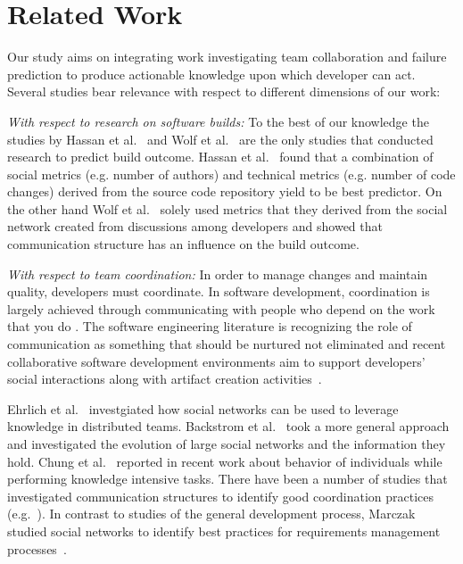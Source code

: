 \section{Related Work}
\label{sec:relwork}
Our study aims on integrating work investigating team collaboration and failure prediction to produce actionable knowledge upon which developer can act.
Several studies bear relevance with respect to different dimensions of our work:

\emph{With respect to research on software builds:}
To the best of our knowledge the studies by Hassan et al.~\cite{hassan:ase:2006}
and Wolf et al.~\cite{wolf:icse:2009} are the only studies that conducted
research to predict build outcome. Hassan et al.~\cite{hassan:ase:2006} found
that a combination of social metrics (e.g. number of authors) and technical
metrics (e.g. number of code changes) derived from the source code repository
yield to be best predictor. On the other hand Wolf et al.~\cite{wolf:icse:2009}
solely used metrics that they derived from the social network created from
discussions among developers and showed that communication structure has an
influence on the build outcome.

\emph{With respect to team coordination:}
In
order to manage changes and maintain quality, developers must coordinate. In
software development, coordination is largely achieved through communicating with
people who depend on the work that you do \cite{kraut1995:coordination}. The
software engineering literature is recognizing the role of communication as
something that should be nurtured not eliminated and recent
collaborative software development environments aim to support developers'
social interactions along with artifact creation activities~\cite{nakakoji2010:rdc}.


Ehrlich et al.~\cite{ehrlich:icgse:2006} investgiated how social networks can be
used to leverage knowledge in distributed teams. Backstrom et
al.~\cite{backstrom:kdd:2006} took a more general approach and investigated the
evolution of large social networks and the information they hold. Chung et
al.~\cite{chung:cpr:07} reported in recent work about behavior of individuals
while performing knowledge intensive tasks. There have been a number of studies
that investigated communication structures to identify good
coordination practices
(e.g.~\cite{hinds:cscw:2006,hossain:cscw:2006,bird:fse:2008,hinds:hicss:2008}). In contrast to studies of the general development process, Marczak studied social
networks to identify best practices for requirements management
processes~\cite{marczak:re:2008}.

